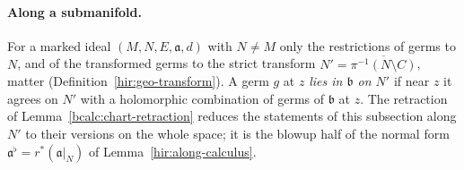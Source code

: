 \paragraph{Along a submanifold.} For a marked ideal \((M,N,E,\mathfrak a,d)\) with \(N\ne M\) only the restrictions of germs to \(N\), and of the
transformed germs to the strict transform \(N'=\overline{\pi^{-1}(N\setminus C)}\), matter (Definition~\ref{hir:geo-transform}). A germ \(g\) at \(z\)
\emph{lies in \(\mathfrak b\) on \(N'\)} if near \(z\) it agrees on \(N'\) with a holomorphic combination of germs of \(\mathfrak b\) at \(z\). The
retraction of Lemma~\ref{bcalc:chart-retraction} reduces the statements of this subsection along \(N'\) to their versions on the whole space; it is the
blowup half of the normal form \(\mathfrak a^\flat=r^*(\mathfrak a|_N)\) of Lemma~\ref{hir:along-calculus}.


